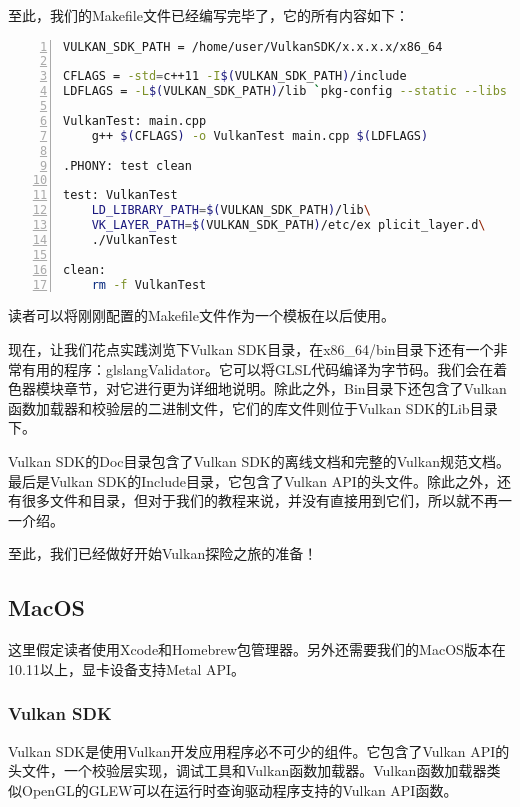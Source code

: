 \documentclass{ctexart}
\begin{document}
至此，我们的Makefile文件已经编写完毕了，它的所有内容如下：

\begin{lstlisting}[language={bash},keywordstyle=\color{blue!70},commentstyle=\color{red!50!green!50!blue!50},frame=shadowbox, rulesepcolor=\color{red!20!green!20!blue!20},basicstyle=\small,numbers=left, numberstyle=\tiny,breaklines=true]
VULKAN_SDK_PATH = /home/user/VulkanSDK/x.x.x.x/x86_64

CFLAGS = -std=c++11 -I$(VULKAN_SDK_PATH)/include
LDFLAGS = -L$(VULKAN_SDK_PATH)/lib `pkg-config --static --libs glfw3` -lvulkan

VulkanTest: main.cpp
	g++ $(CFLAGS) -o VulkanTest main.cpp $(LDFLAGS)

.PHONY: test clean

test: VulkanTest
	LD_LIBRARY_PATH=$(VULKAN_SDK_PATH)/lib\
	VK_LAYER_PATH=$(VULKAN_SDK_PATH)/etc/ex	plicit_layer.d\
	./VulkanTest

clean:
	rm -f VulkanTest
\end{lstlisting}

读者可以将刚刚配置的Makefile文件作为一个模板在以后使用。

现在，让我们花点实践浏览下Vulkan SDK目录，在x86\_64/bin目录下还有一个非常有用的程序：glslangValidator。它可以将GLSL代码编译为字节码。我们会在着色器模块章节，对它进行更为详细地说明。除此之外，Bin目录下还包含了Vulkan函数加载器和校验层的二进制文件，它们的库文件则位于Vulkan SDK的Lib目录下。

Vulkan SDK的Doc目录包含了Vulkan SDK的离线文档和完整的Vulkan规范文档。最后是Vulkan SDK的Include目录，它包含了Vulkan API的头文件。除此之外，还有很多文件和目录，但对于我们的教程来说，并没有直接用到它们，所以就不再一一介绍。

至此，我们已经做好开始Vulkan探险之旅的准备！

\subsection{MacOS}

这里假定读者使用Xcode和Homebrew包管理器。另外还需要我们的MacOS版本在10.11以上，显卡设备支持Metal API。

\subsubsection{Vulkan SDK}

Vulkan SDK是使用Vulkan开发应用程序必不可少的组件。它包含了Vulkan API的头文件，一个校验层实现，调试工具和Vulkan函数加载器。Vulkan函数加载器类似OpenGL的GLEW可以在运行时查询驱动程序支持的Vulkan API函数。
\end{document}
